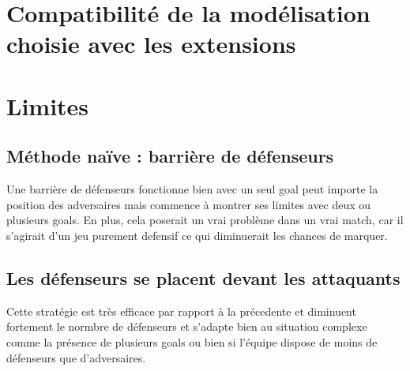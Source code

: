 \documentclass{article}
\begin{document}



\section{Compatibilité de la modélisation choisie avec les extensions}



\section{Limites}

\subsection{Méthode naïve : barrière de défenseurs}
Une barrière de défenseurs fonctionne bien avec un seul goal peut importe la position des adversaires
mais commence à montrer ses limites avec deux ou plusieurs goals.
En plus, cela poserait un vrai problème dans un vrai match, car il s'agirait d'un jeu purement defensif
ce qui diminuerait les chances de marquer.

\subsection{Les défenseurs se placent devant les attaquants}
Cette stratégie est très efficace par rapport à la précedente et diminuent fortement le normbre de défenseurs et
s'adapte bien au situation complexe comme la présence de plusieurs goals ou bien si l'équipe dispose de moins de
défenseurs que d'adversaires.
\end{document}
